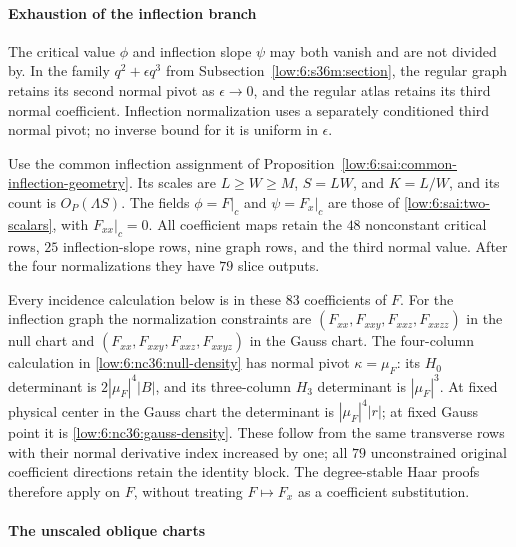 \documentclass[11pt]{amsart}
\theoremstyle{definition}
\theoremstyle{remark}
\numberwithin{equation}{section}
\begin{document}
\paragraph{Exhaustion of the inflection branch}

The critical value $\phi$ and inflection slope $\psi$ may both vanish and are not divided by. In the family $q^2+\epsilon q^3$ from Subsection~\ref{low:6:s36m:section}, the regular graph retains its second normal pivot as $\epsilon\to0$, and the regular atlas retains its third normal coefficient. Inflection normalization uses a separately conditioned third normal pivot; no inverse bound for it is uniform in $\epsilon$.

Use the common inflection assignment of Proposition~\ref{low:6:sai:common-inflection-geometry}. Its scales are $L\ge W\ge M$, $S=LW$, and $K=L/W$, and its count is $O_P(\Lambda S)$. The fields $\phi=F|_c$ and $\psi=F_x|_c$ are those of \eqref{low:6:sai:two-scalars}, with $F_{xx}|_c=0$. All coefficient maps retain the $48$ nonconstant critical rows, $25$ inflection-slope rows, nine graph rows, and the third normal value. After the four normalizations they have $79$ slice outputs.

Every incidence calculation below is in these $83$ coefficients of $F$. For the inflection graph the normalization constraints are $(F_{xx},F_{xxy},F_{xxz},F_{xxzz})$ in the null chart and $(F_{xx},F_{xxy},F_{xxz},F_{xxyz})$ in the Gauss chart. The four-column calculation in \eqref{low:6:nc36:null-density} has normal pivot $\kappa=\mu_F$: its $H_0$ determinant is $2|\mu_F|^4|B|$, and its three-column $H_3$ determinant is $|\mu_F|^3$. At fixed physical center in the Gauss chart the determinant is $|\mu_F|^4|r|$; at fixed Gauss point it is \eqref{low:6:nc36:gauss-density}. These follow from the same transverse rows with their normal derivative index increased by one; all $79$ unconstrained original coefficient directions retain the identity block. The degree-stable Haar proofs therefore apply on $F$, without treating $F\mapsto F_x$ as a coefficient substitution.

\paragraph{The unscaled oblique charts}
\end{document}
